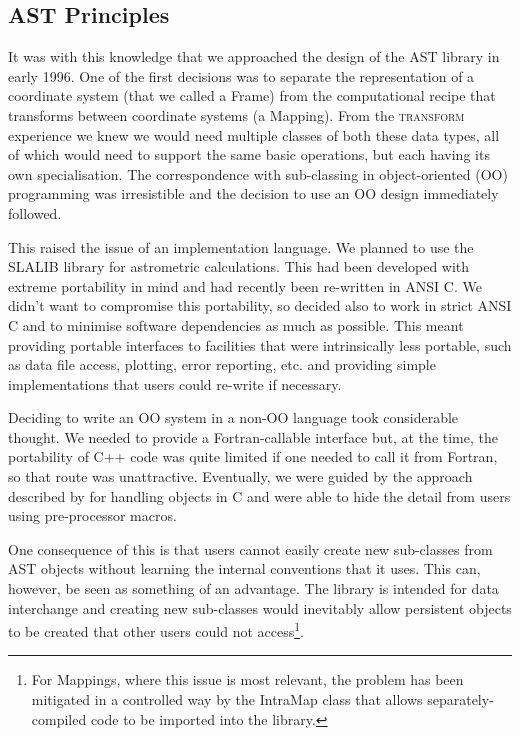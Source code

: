 \documentclass[final,authoryear,5p,times,twocolumn]{elsarticle}
\begin{document}
\subsection{AST Principles}

It was with this knowledge that we approached the design of the AST
library in early 1996. One of the first decisions was to
separate the representation of a coordinate system (that we called a
Frame) from the computational recipe that transforms between
coordinate systems (a Mapping). From the \textsc{transform} experience
we knew we would need multiple classes of both these data types, all
of which would need to support the same basic operations, but each
having its own specialisation. The correspondence with sub-classing in
object-oriented (OO) programming was irresistible and the decision to
use an OO design immediately followed.

This raised the issue of an implementation language. We planned to use
the SLALIB library for astrometric calculations. This had been
developed with extreme portability in mind and had recently been
re-written in ANSI C. We didn't want to compromise this portability,
so decided also to work in strict ANSI C and to minimise software
dependencies as much as possible. This meant providing portable
interfaces to facilities that were intrinsically less portable, such
as data file access, plotting, error reporting, etc. and providing
simple implementations that users could re-write if necessary.

Deciding to write an OO system in a non-OO language took considerable
thought. We needed to provide a Fortran-callable interface but, at the
time, the portability of C++ code was quite limited if one needed to
call it from Fortran, so that route was unattractive. Eventually, we
were guided by the approach described by \citet{1992Holub} for
handling objects in C and were able to hide the detail from users
using pre-processor macros.

One consequence of this is that users cannot easily create new
sub-classes from AST objects without learning the internal conventions
that it uses. This can, however, be seen as something of an advantage.
The library is intended for data interchange and creating new
sub-classes would inevitably allow persistent objects to be created
that other users could not access\footnote{For Mappings, where this
  issue is most relevant, the problem has been mitigated in a
  controlled way by the IntraMap class that allows separately-compiled
  code to be imported into the library.}.
\end{document}
